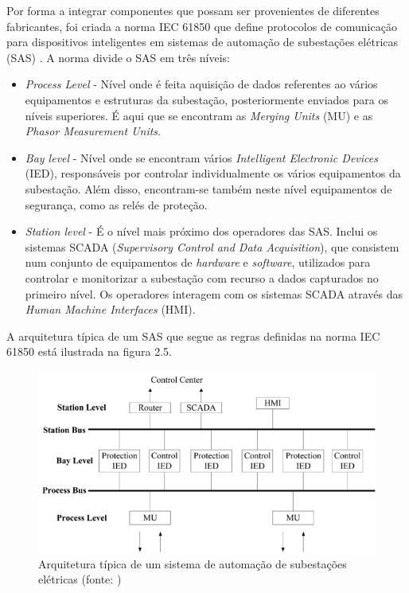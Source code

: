 \iffalse
Por forma a integrar componentes que possam ser provenientes de diferentes fabricantes, foi criada a norma IEC 61850 que define protocolos de comunicação para dispositivos inteligentes em sistemas de automação de subestações elétricas (SAS) \cite{SAS}. A norma divide o SAS em três níveis:

\begin{itemize}
  \item \textit{Process Level} - Nível onde é feita aquisição de dados referentes ao vários equipamentos e estruturas da subestação, posteriormente enviados para os níveis superiores. É aqui que se encontram as \textit{Merging Units} (MU) e as \textit{Phasor Measurement Units}. 
  \item \textit{Bay level} - Nível onde se encontram vários \textit{Intelligent Electronic Devices} (IED), responsáveis por controlar individualmente os vários equipamentos da subestação. Além disso, encontram-se também neste nível equipamentos de segurança, como as relés de proteção.
  \item \textit{Station level} - É o nível mais próximo dos operadores das SAS. Inclui os sistemas SCADA (\textit{Supervisory Control and Data Acquisition}), que consistem num conjunto de equipamentos de \textit{hardware} e \textit{software}, utilizados para controlar e monitorizar a subestação com recurso a dados capturados no primeiro nível. Os operadores interagem com os sistemas SCADA através das \textit{Human Machine Interfaces} (HMI).
\end{itemize}

A arquitetura típica de um SAS que segue as regras definidas na norma IEC 61850 está ilustrada na figura 2.5.

\begin{figure}[H]
  \centering
  \includegraphics[width=1\textwidth]{SAS.png}
  \caption[Arquitetura típica de um sistema de automação de subestações elétricas ]{Arquitetura típica de um sistema de automação de subestações elétricas (fonte: \cite{comparison})}
  
  \label{fig:airbus1}
\end{figure}


